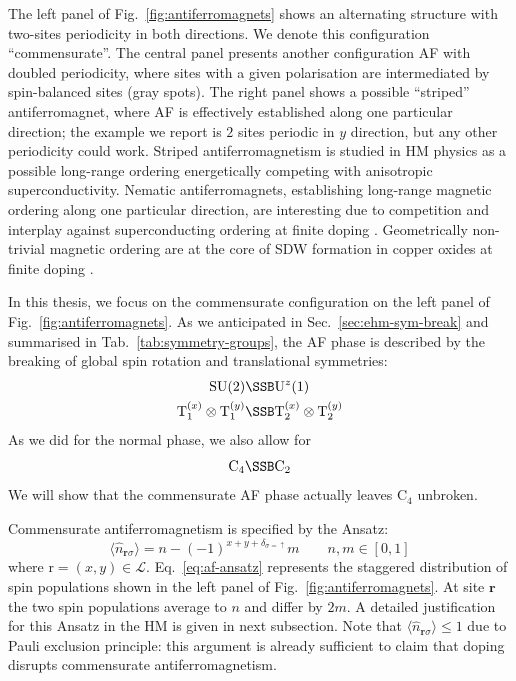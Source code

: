 The left panel of Fig.~\ref{fig:antiferromagnets} shows an alternating structure with two-sites periodicity in both directions. We denote this configuration ``commensurate''. The central panel presents another configuration AF with doubled periodicity, where sites with a given polarisation are intermediated by spin-balanced sites (gray spots). The right panel shows a possible ``striped'' antiferromagnet, where AF is effectively established along one particular direction; the example we report is $2$ sites periodic in $y$ direction, but any other periodicity could work. Striped antiferromagnetism is studied in HM physics \cite{wietek2021stripes} as a possible long-range ordering energetically competing with anisotropic superconductivity. Nematic antiferromagnets, establishing long-range magnetic ordering along one particular direction, are interesting due to competition and interplay against superconducting ordering at finite doping \cite{qin2020absence}. Geometrically non-trivial magnetic ordering are at the core of SDW formation in copper oxides at finite doping \cite{zaanen1989charged,kato1990soliton}.

In this thesis, we focus on the commensurate configuration on the left panel of Fig.~\ref{fig:antiferromagnets}. As we anticipated in Sec.~\ref{sec:ehm-sym-break} and summarised in Tab.~\ref{tab:symmetry-groups}, the AF phase is described by the breaking of global spin rotation and translational symmetries:
\[
\begin{aligned}
	\mathrm{SU}(2) &\SSB \mathrm{U}^z(1) \\
	\mathrm{T}_1^{(x)} \otimes \mathrm{T}_1^{(y)} &\SSB \mathrm{T}_2^{(x)} \otimes \mathrm{T}_2^{(y)}
\end{aligned}
\]
As we did for the normal phase, we also allow for
\[
\mathrm{C}_4 \SSB \mathrm{C}_2
\]
We will show that the commensurate AF phase actually leaves $\mathrm{C}_4$ unbroken.

Commensurate antiferromagnetism is specified by the Ansatz:
\begin{equation}\label{eq:af-ansatz}
	\langle \hat n_{\mathbf{r}\sigma} \rangle = n - (-1)^{x+y+\delta_{\sigma=\uparrow}} m
	\qquad
	n, m \in [0,1]
\end{equation}
where $\mathrm{r}=(x,y) \in \mathcal{L}$. Eq.~\eqref{eq:af-ansatz} represents the staggered distribution of spin populations shown in the left panel of Fig.~\ref{fig:antiferromagnets}. At site $\mathbf{r}$ the two spin populations average to $n$ and differ by $2m$. A detailed justification for this Ansatz in the HM is given in next subsection. Note that $\langle \hat n_{\mathbf{r}\sigma} \rangle \le 1$ due to Pauli exclusion principle: this argument is already sufficient to claim that doping disrupts commensurate antiferromagnetism.

